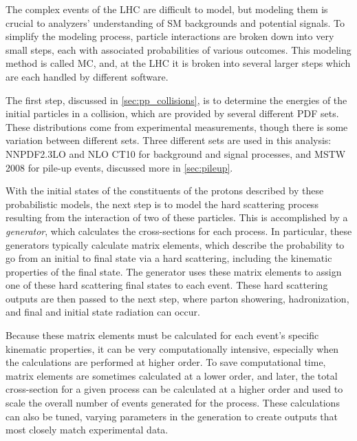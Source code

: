 The complex events of the \ac{LHC} are difficult to model, but modeling them is crucial to analyzers' understanding of \ac{SM} backgrounds and potential signals. To simplify the modeling process, particle interactions are broken down into very small steps, each with associated probabilities of various outcomes. This modeling method is called \acf{MC}, and, at the \ac{LHC} it is broken into several larger steps which are each handled by different software. 

The first step, discussed in \autoref{sec:pp_collisions}, is to determine the energies of the initial particles in a collision, which are provided by several different \ac{PDF} sets. These distributions come from experimental measurements, though there is some variation between different sets. Three different sets are used in this analysis: NNPDF2.3LO \cite{Ball:2012cx} and NLO CT10 \cite{Lai:2010vv} for background and signal processes, and MSTW 2008 \cite{0901.0002} for pile-up events, discussed more in \autoref{sec:pileup}. 

With the initial states of the constituents of the protons described by these probabilistic models, the next step is to model the hard scattering process resulting from the interaction of two of these particles. This is accomplished by a \textit{generator}, which calculates the cross-sections for each process. In particular, these generators typically calculate matrix elements, which describe the probability to go from an initial to final state via a hard scattering, including the kinematic properties of the final state. The generator uses these matrix elements to assign one of these hard scattering final states to each event. These hard scattering outputs are then passed to the next step, where parton showering, hadronization, and final and initial state radiation can occur.

Because these matrix elements must be calculated for each event's specific kinematic properties, it can be very computationally intensive, especially when the calculations are performed at higher order. To save computational time, matrix elements are sometimes calculated at a lower order, and later, the total cross-section for a given process can be calculated at a higher order and used to scale the overall number of events generated for the process. These calculations can also be tuned, varying parameters in the generation to create outputs that most closely match experimental data. 
  

